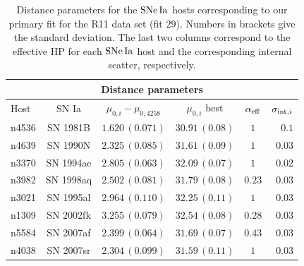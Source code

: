 \begin{table}[tbp]
\centering
\begin{tabular}{@{}lccccr}
\hline
\multicolumn{6}{c}{Distance parameters} \\
\hline
Host & SN Ia & $\mu_{0,i}-\mu_{0,4258}$ & $\mu_{0,i} $ best & $\alpha_{\mathrm{eff}}$ & $\sigma_{\mathrm{int},i}$\\
\hline

 n4536 & SN 1981B & $1.620\,(0.071)$&$30.91\,(0.08)$ &$1$ & $0.1$ \\

 n4639 & SN 1990N & $2.325\,(0.085)$& $31.61\,(0.09)$& $1 $ & $0.03$\\

 n3370 & SN 1994ae & $2.805\,(0.063)$& $32.09\,(0.07)$& $1 $ & $0.02$ \\
 
 n3982 & SN 1998aq & $2.502\,(0.081)$& $31.79\,(0.08)$& $ 0.23$ & $0.03$\\
  
 n3021 & SN 1995al & $2.964\,(0.110)$& $32.25\,(0.11)$& $ 1$ & $0.03$\\
    
 n1309 & SN 2002fk & $3.255\,(0.079)$& $32.54\,(0.08)$& $ 0.28$ & $0.03$\\

 n5584 & SN 2007af & $2.399\,(0.064)$& $31.69\,(0.07)$& $ 0.43$ & $0.03$\\
       
 n4038 & SN 2007sr & $2.304\,(0.099)$& $31.59\,(0.11)$& $ 1$ & $0.03$\\
       
\hline
\end{tabular}
\caption{\label{Table:SNIa-HP-fit-M1a} Distance parameters for the $\mathrm{SNe\,Ia}$ hosts corresponding to our primary fit for the R11 data set (fit $29$). Numbers in brackets give the standard deviation. The last two columns correspond to the effective HP for each $\mathrm{SNe\,Ia}$ host and the corresponding internal scatter, respectively.}
\end{table}

